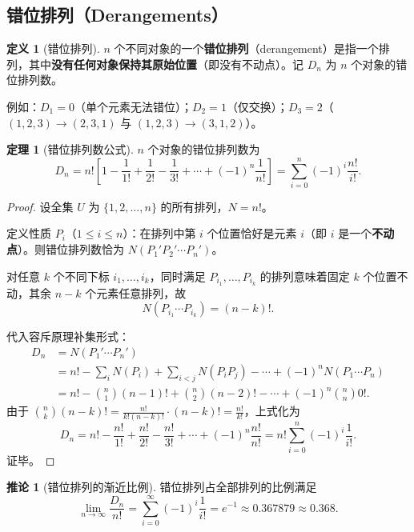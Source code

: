 \documentclass[UTF8,11pt,a4paper]{ctexbook}   %
\theoremstyle{definition}
\newtheorem{definition}{定义}[section]
\newtheorem{theorem}{定理}[section]
\newtheorem{corollary}{推论}[section]
\begin{document}
\subsection{错位排列（Derangements）}

\begin{definition}[错位排列]
$n$ 个不同对象的一个\textbf{错位排列}（derangement）是指一个排列，其中\textbf{没有任何对象保持其原始位置}（即没有不动点）。记 $D_n$ 为 $n$ 个对象的错位排列数。

例如：$D_1=0$（单个元素无法错位）；$D_2=1$（仅交换）；$D_3=2$（$(1,2,3)\to(2,3,1)$ 与 $(1,2,3)\to(3,1,2)$）。
\end{definition}

\begin{theorem}[错位排列数公式]\label{thm:derangement}
$n$ 个对象的错位排列数为
\[
\boxed{D_n = n!\left[1-\frac{1}{1!}+\frac{1}{2!}-\frac{1}{3!}+\cdots+(-1)^n\frac{1}{n!}\right]
= \sum_{i=0}^{n}(-1)^i\frac{n!}{i!}.}
\]
\end{theorem}

\begin{proof}
设全集 $U$ 为 $\{1,2,\dots,n\}$ 的所有排列，$N=n!$。

定义性质 $P_i$（$1\le i\le n$）：在排列中第 $i$ 个位置恰好是元素 $i$（即 $i$ 是一个\textbf{不动点}）。则错位排列数恰为 $N(P_1'P_2'\cdots P_n')$。

对任意 $k$ 个不同下标 $i_1,\dots,i_k$，同时满足 $P_{i_1},\dots,P_{i_k}$ 的排列意味着固定 $k$ 个位置不动，其余 $n-k$ 个元素任意排列，故
\[
N(P_{i_1}\cdots P_{i_k})=(n-k)!.
\]

代入容斥原理补集形式：
\begin{align*}
D_n &= N(P_1'\cdots P_n')\\
&= n! - \sum_{i}N(P_i) + \sum_{i<j}N(P_iP_j) - \cdots + (-1)^n N(P_1\cdots P_n)\\
&= n! - \binom{n}{1}(n-1)! + \binom{n}{2}(n-2)! - \cdots + (-1)^n\binom{n}{n}0!.
\end{align*}
由于 $\displaystyle\binom{n}{k}(n-k)!=\frac{n!}{k!(n-k)!}\cdot(n-k)!=\frac{n!}{k!}$，上式化为
\[
D_n = n! - \frac{n!}{1!} + \frac{n!}{2!} - \frac{n!}{3!} + \cdots + (-1)^n\frac{n!}{n!}
= n!\sum_{i=0}^{n}(-1)^i\frac{1}{i!}.
\]
证毕。
\end{proof}

\begin{corollary}[错位排列的渐近比例]
错位排列占全部排列的比例满足
\[
\boxed{\lim_{n\to\infty}\frac{D_n}{n!}=\sum_{i=0}^{\infty}(-1)^i\frac{1}{i!}=e^{-1}\approx 0.367879\approx 0.368.}
\]
\end{corollary}
\end{document}
